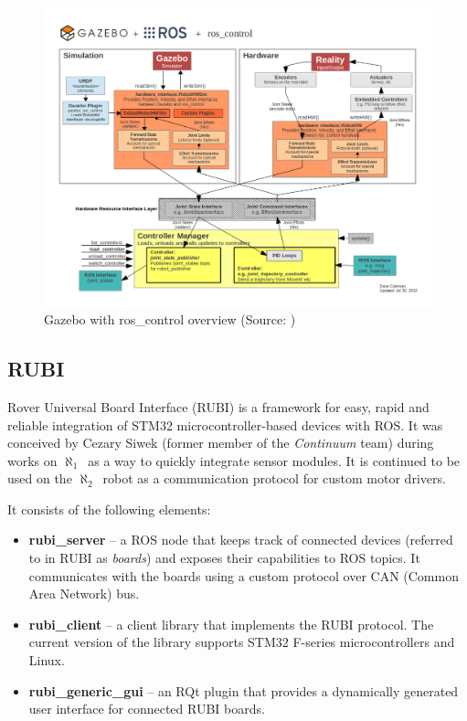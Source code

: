 \documentclass[english,inz,shortabstract]{iithesis}
\newcommand{\val}[1]{\textbf{\textsf{#1}}}
\newcommand{\oldrovername}{$\aleph_1$\ }
\newcommand{\rovername}{$\aleph_2$\ }
\begin{document}
	\begin{figure}[ht]
		\centering
		\includegraphics[width=\textwidth]{img/gazebo_control.png}
		\caption{Gazebo with ros\_control overview (Source: \cite{gazebo:ros_control})}
		\label{fig:gazebo_control}
	\end{figure}

\pagebreak

	\subsection{RUBI}
	Rover Universal Board Interface (RUBI) is a framework for easy, rapid and reliable integration of STM32 microcontroller-based devices with ROS. It was conceived by Cezary Siwek (former member of the \textit{Continuum} team) during works on \oldrovername as a way to quickly integrate sensor modules. It is continued to be used on the \rovername robot as a communication protocol for custom motor drivers.

	It consists of the following elements:
	\begin{itemize}
		\item \val{rubi\_server} -- a ROS node that keeps track of connected devices (referred to in RUBI as \textit{boards}) and exposes their capabilities to ROS topics. It communicates with the boards using a custom protocol over CAN (Common Area Network) bus. 
		\item \val{rubi\_client} -- a client library that implements the RUBI protocol. The current version of the library supports STM32 F-series microcontrollers and Linux.
		\item \val{rubi\_generic\_gui} -- an RQt plugin that provides a dynamically generated user interface for connected RUBI boards.

	\end{itemize}
\end{document}
